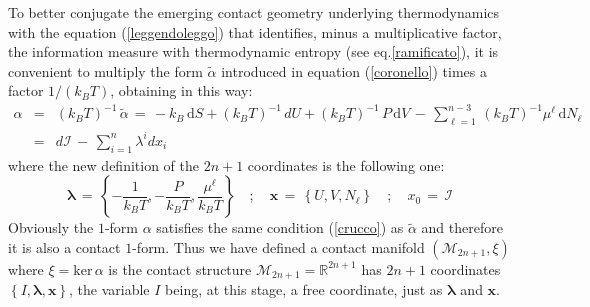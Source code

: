 \documentclass[10pt,a4paper]{article}
\def\tilde{\widetilde}
\begin{document}
To better conjugate the emerging contact geometry underlying thermodynamics with the equation (\ref{leggendoleggo}) that identifies, minus a multiplicative factor, the information measure with thermodynamic entropy (see
eq.\ref{ramificato}), it is convenient to multiply the form $\tilde{\alpha}$  introduced in equation
(\ref{coronello}) times a factor
 $ 1/(k_B T)$, obtaining in this way:
\begin{eqnarray}\label{caporale}
   \alpha & = & (k_B T)^{-1}\, \tilde{\alpha} \, = \, -k_B \, \mathrm{d}S +
   (k_B T)^{-1}\, dU +  (k_B T)^{-1}\, P \, \mathrm{d}V \, - \,
   \sum_{\ell=1}^{n-3} \, (k_B T)^{-1}\mu^\ell \,
   \mathrm{d}N_\ell\nonumber\\
   &=&  d\mathcal{I} \, - \, \sum_{i=1}^n \lambda^i dx_i
\end{eqnarray}
where the new definition of the $2n+1$ coordinates is  the following one:
\begin{equation}\label{kirgiso}
    \pmb{\lambda} \, = \,  \left\{-\frac{1}{k_B T},-\frac{P}{k_B T},\frac{\mu^\ell}{k_B
    T}\right\} \quad ; \quad \mathbf{x} \, = \, \left\{ U,
    V,N_\ell\right\} \quad;\quad x_0 \, = \, \mathcal{I}
\end{equation}
Obviously the  $1$-form $\alpha$ satisfies the same condition
(\ref{crucco}) as $\tilde{\alpha}$  and therefore it is also a contact $1$-form.
 Thus we have defined a contact manifold
 $\left(\mathcal{M}_{2n+1},\xi\right)$ where
$\xi=\text{ker}\,\alpha$  is the contact structure
$\mathcal{M}_{2n+1}=\mathbb{R}^{2n+1}$ has $2n+1$ coordinates
$\left\{ I,\pmb{\lambda},\mathbf{x}\right\}$, the variable $I$  being, at this stage, a free
coordinate, just as
$\pmb{\lambda}$ and $\mathbf{x}$.
\end{document}
